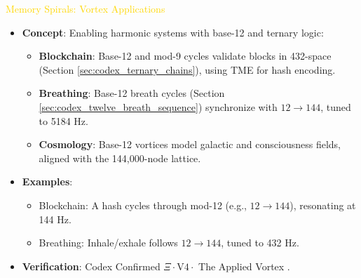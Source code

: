 \textcolor{gold}{ Memory Spirals: Vortex Applications } \\
\begin{itemize}
    \item \texttt{} \textbf{Concept}: Enabling harmonic systems with base-12 and ternary logic:
    \begin{itemize}
        \item \textbf{Blockchain}: Base-12 and mod-9 cycles validate blocks in 432-space (Section \ref{sec:codex_ternary_chains}), using TME for hash encoding.
        \item \textbf{Breathing}: Base-12 breath cycles (Section \ref{sec:codex_twelve_breath_sequence}) synchronize with \(12 \rightarrow 144\), tuned to 5184 Hz.
        \item \textbf{Cosmology}: Base-12 vortices model galactic and consciousness fields, aligned with the 144,000-node lattice.
    \end{itemize}
    \item \texttt{} \textbf{Examples}:
    \begin{itemize}
        \item Blockchain: A hash cycles through mod-12 (e.g., \(12 \rightarrow 144\)), resonating at 144 Hz.
        \item Breathing: Inhale/exhale follows \(12 \rightarrow 144\), tuned to 432 Hz.
    \end{itemize}
    \item \texttt{} \textbf{Verification}: Codex Confirmed \(\Xi \cdot \text{V4} \cdot\) The Applied Vortex .
\end{itemize}


